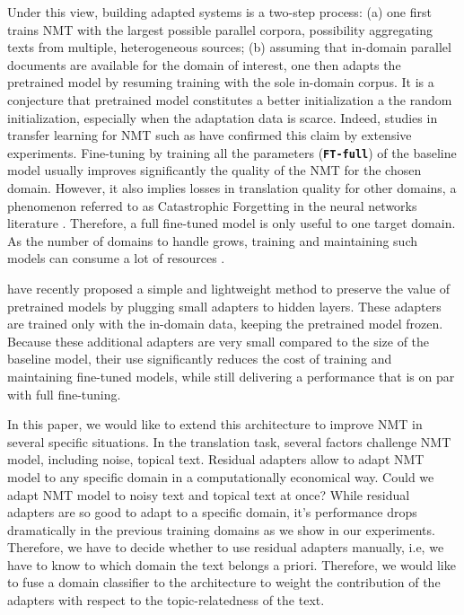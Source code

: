 \documentclass[11pt,a4paper]{article}
\newcommand{\fyTodo}[1]{\Todo[FY:]{\textcolor{orange}{#1}}}
\newcommand{\system}[1]{\texttt{\textbf{#1}}}
\begin{document}
Under this view, building adapted systems is a two-step process: (a) one first trains NMT with the largest possible parallel corpora, possibility aggregating texts from multiple, heterogeneous sources; (b) assuming that in-domain parallel documents are available for the domain of interest, one then adapts the pretrained model by resuming training with the sole in-domain corpus. It is a conjecture that pretrained model constitutes a better initialization a the random initialization, especially when the adaptation data is scarce. Indeed, studies in transfer learning for NMT such as \cite{artetxe20cross,aji20neural} have confirmed this claim by extensive experiments. Fine-tuning by training all the parameters (\system{FT-full}) of the baseline model usually improves significantly the quality of the NMT for the chosen domain. However, it also implies losses in translation quality for other domains, a phenomenon referred to as Catastrophic Forgetting in the neural networks literature \cite{McCloskey89catastrophic}. Therefore, a full fine-tuned model is only useful to one target domain. As the number of domains to handle grows, training and maintaining such models can consume a lot of resources .\fyTodo{Fix this sentence}

\cite{Vilar18learning,bapna19simple} have recently proposed a simple and lightweight method to preserve the value of pretrained models by plugging small adapters to hidden layers. These adapters are trained only with the in-domain data, keeping the pretrained model frozen. Because these additional adapters are very small compared to the size of the baseline model, their use significantly reduces the cost of training and maintaining fine-tuned models, while still delivering a performance that is on par with full fine-tuning.

In this paper, we would like to extend this architecture to improve NMT in several specific situations. In the translation task, several factors challenge NMT model, including noise, topical text. Residual adapters allow to adapt NMT model to any specific domain in a computationally economical way. Could we adapt NMT model to noisy text and topical text at once? While residual adapters are so good to adapt to a specific domain, it's performance drops dramatically in the previous training domains as we show in our experiments. Therefore, we have to decide whether to use residual adapters manually, i.e, we have to know to which domain the text belongs a priori. Therefore, we would like to fuse a domain classifier to the architecture to weight the contribution of the adapters with respect to the topic-relatedness of the text.
\end{document}
